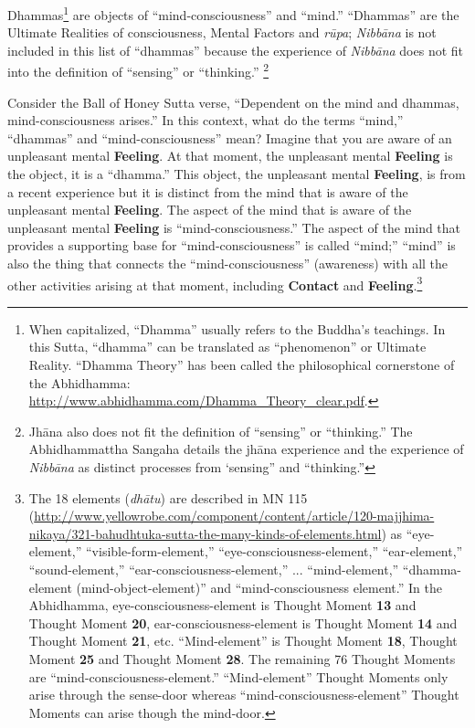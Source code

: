 Dhammas\footnote{When capitalized, “Dhamma” usually refers to the Buddha’s teachings. In this Sutta, “dhamma” can be translated as “phenomenon” or Ultimate Reality. “Dhamma Theory” has been called the philosophical cornerstone of the Abhidhamma: \url{http://www.abhidhamma.com/Dhamma_Theory_clear.pdf}.} are objects of “mind-consciousness” and “mind.” “Dhammas” are the Ultimate Realities of consciousness, Mental Factors and \textit{rūpa}; \textit{Nibbāna} is not included in this list of “dhammas” because the experience of \textit{Nibbāna} does not fit into the definition of “sensing” or “thinking.” \footnote{Jhāna also does not fit the definition of “sensing” or “thinking.” The Abhidhammattha Sangaha details the jhāna experience and the experience of \textit{Nibbāna} as distinct processes from `sensing” and “thinking.”}

Consider the Ball of Honey Sutta verse, “Dependent on the mind and dhammas, mind-consciousness arises.” In this context, what do the terms “mind,” “dhammas” and “mind-consciousness” mean? Imagine that you are aware of an unpleasant mental \textbf{Feeling}. At that moment, the unpleasant mental \textbf{Feeling} is the object, it is a “dhamma.” This object, the unpleasant mental \textbf{Feeling}, is from a recent experience but it is distinct from the mind that is aware of the unpleasant mental \textbf{Feeling}. The aspect of the mind that is aware of the unpleasant mental \textbf{Feeling} is “mind-consciousness.” The aspect of the mind that provides a supporting base for “mind-consciousness” is called “mind;” “mind” is also the thing that connects the “mind-consciousness” (awareness) with all the other activities arising at that moment, including \textbf{Contact} and \textbf{Feeling}.\footnote{The 18 elements (\textit{dhātu}) are described in MN 115 (\url{http://www.yellowrobe.com/component/content/article/120-majjhima-nikaya/321-bahudhtuka-sutta-the-many-kinds-of-elements.html}) as “eye-element,” “visible-form-element,” “eye-consciousness-element,” “ear-element,” “sound-element,” “ear-consciousness-element,” ... “mind-element,” “dhamma-element (mind-object-element)” and “mind-consciousness element.” In the Abhidhamma, eye-consciousness-element is Thought Moment \textbf{13} and Thought Moment \textbf{20}, ear-consciousness-element is Thought Moment \textbf{14} and Thought Moment \textbf{21}, etc. “Mind-element” is Thought Moment \textbf{18}, Thought Moment \textbf{25} and Thought Moment \textbf{28}. The remaining 76 Thought Moments are “mind-consciousness-element.” “Mind-element” Thought Moments only arise through the sense-door whereas “mind-consciousness-element” Thought Moments can arise though the mind-door.}

